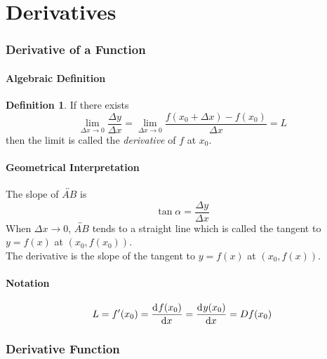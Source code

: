 \documentclass[fleqn]{article}
\theoremstyle{definition}
\newtheorem{definition}{Definition}
\theoremstyle{theorem}
\theoremstyle{remark}
\begin{document}
\part{Derivatives}

\section{Derivative of a Function}

\subsection{Algebraic Definition}


\begin{definition}
	If there exists
	\begin{equation*}
		\lim\limits_{\Delta x \rightarrow 0} \dfrac{\Delta y}{\Delta x} = \lim\limits_{\Delta x \rightarrow 0} \dfrac{f(x_0 + \Delta x) - f(x_0)}{\Delta x} = L
	\end{equation*}
	then the limit is called the \emph{derivative} of $f$ at $x_0$.
\end{definition}

\subsection{Geometrical Interpretation}

The slope of $\overleftrightarrow{AB}$ is 
\begin{equation*}
	\tan \alpha = \dfrac{\Delta y}{\Delta x}
\end{equation*}
When $\Delta x \rightarrow 0$, $\overleftrightarrow{AB}$ tends to a straight line which is called the tangent to $y = f(x)$ at $(x_0, f(x_0))$.\\
The derivative is the slope of the tangent to $y = f(x)$ at $(x_0, f(x))$.

\subsection{Notation}

\begin{equation*}
	L = f'(x_0) = \dod{f(x_0)}{x} = \dod{y(x_0)}{x} = D f(x_0)	 
\end{equation*}

\section{Derivative Function}
\end{document}
